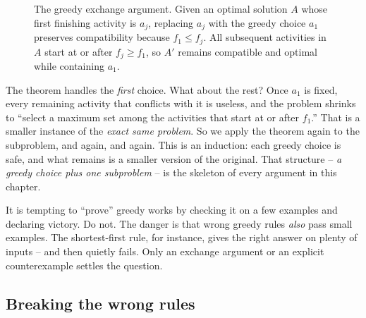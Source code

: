 \begin{figure}[h]
\caption{The greedy exchange argument. Given an optimal solution $A$ whose first finishing activity is $a_j$, replacing $a_j$ with the greedy choice $a_1$ preserves compatibility because $f_1 \le f_j$. All subsequent activities in $A$ start at or after $f_j \ge f_1$, so $A'$ remains compatible and optimal while containing $a_1$.}
\label{ch16:fig-exchange-argument}
\end{figure}

The theorem handles the \emph{first} choice. What about the rest? Once $a_1$ is
fixed, every remaining activity that conflicts with it is useless, and the
problem shrinks to ``select a maximum set among the activities that start at or
after $f_1$.'' That is a smaller instance of the \emph{exact same problem}. So we
apply the theorem again to the subproblem, and again, and again. This is an
induction: each greedy choice is safe, and what remains is a smaller version of
the original. That structure -- \emph{a greedy choice plus one subproblem} -- is
the skeleton of every argument in this chapter.

\begin{trapbox}
It is tempting to ``prove'' greedy works by checking it on a few examples and
declaring victory. Do not. The danger is that wrong greedy rules
\emph{also} pass small examples. The shortest-first rule, for instance, gives the
right answer on plenty of inputs -- and then quietly fails. Only an exchange
argument or an explicit counterexample settles the question.
\end{trapbox}

\subsection{Breaking the wrong rules}

